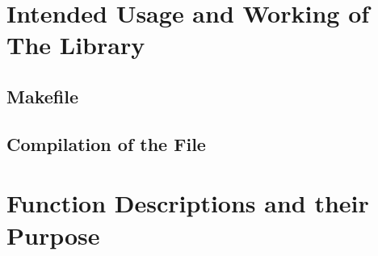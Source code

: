 \documentclass{article}
\begin{document}
  \section{\textbf{Intended Usage and Working of The Library}}
  \subsection{Makefile}
  \subsection{Compilation of the File}
  \section{\textbf{Function Descriptions and their Purpose}}
\end{document}
